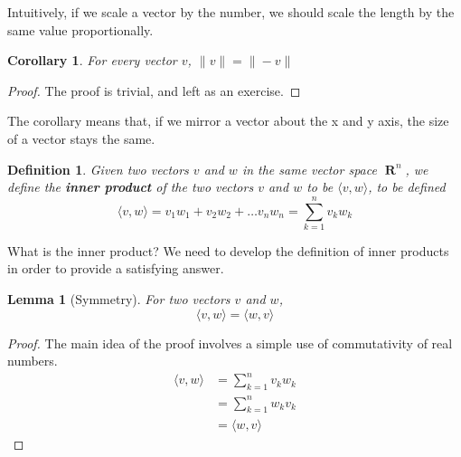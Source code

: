 \documentclass{report}
\newtheorem{lemma}[theorem]{Lemma}
\newtheorem{corollary}[theorem]{Corollary}
\newtheorem{definition}{Definition}
\DeclareMathOperator{\real}{\mathbf{R}}
\begin{document}
Intuitively, if we scale a vector by the number, we should scale the length by the same value proportionally.

\begin{center}
\end{center}

\begin{corollary}
  For every vector $v$, $\| v \| = \| -v \|$
\end{corollary}
\begin{proof}
  The proof is trivial, and left as an exercise.
\end{proof}

The corollary means that, if we mirror a vector about the x and y axis, the size of a vector stays the same.

\begin{center}
\end{center}

\begin{definition}
Given two vectors $v$ and $w$ in the same vector space $\real^n$, we define the {\bf inner product} of the two vectors $v$ and $w$ to be $\langle v, w \rangle$, to be defined
%
\[ \langle v, w \rangle = v_1w_1 + v_2w_2 + \dots v_nw_n = \sum_{k = 1}^n v_k w_k \]
\end{definition}

What is the inner product? We need to develop the definition of inner products in order to provide a satisfying answer.

\begin{lemma}[Symmetry]
  For two vectors $v$ and $w$,
  \[ \langle v, w \rangle = \langle w, v \rangle \]
\end{lemma}
\begin{proof}
  The main idea of the proof involves a simple use of commutativity of real numbers.
  \begin{align*}
    \langle v, w \rangle &= \sum_{k=1}^n v_k w_k\\
                         &= \sum_{k=1}^n w_k v_k\\
                         &= \langle w, v \rangle
  \end{align*}
\end{proof}
\end{document}
